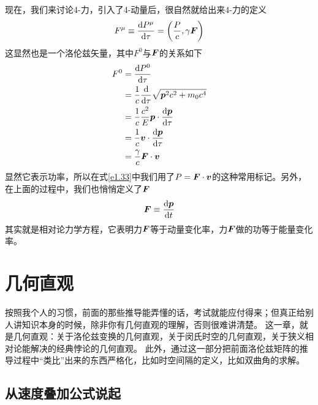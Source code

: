 \documentclass[12pt, a4paper, oneside]{ctexbook}
\begin{document}
现在，我们来讨论4-力，引入了4-动量后，很自然就给出来4-力的定义
\begin{equation}\label{e1.33}
	F^{\mu}\equiv\dv{P^{\mu}}{\tau}=\qty(\dfrac{P}{c},\gamma\vb*{F})
\end{equation}
这显然也是一个洛伦兹矢量，其中$F^{0}$与$\vb*{F}$的关系如下
\begin{equation}
	\begin{split}
		F^{0}&=\dv{P^{0}}{\tau}\\
		&=\dfrac{1}{c}\dv{\tau}\sqrt{\vb*{p}^{2}c^{2}+m_{0}c^{4}}\\
		&=\dfrac{1}{c}\dfrac{c^{2}}{E}\vb*{p}\cdot\dv{\vb*{p}}{\tau}\\
		&=\dfrac{1}{c}\vb*{v}\cdot\dv{\vb*{p}}{\tau}\\
		&=\dfrac{\gamma}{c}\vb*{F}\cdot\vb*{v}
	\end{split}
\end{equation}
显然它表示功率，所以在式\eqref{e1.33}中我们用了$P=\vb*{F}\cdot\vb*{v}$的这种常用标记。另外，在上面的过程中，我们也悄悄定义了$\vb*{F}$
\begin{equation}
	\vb*{F}\equiv\dv{\vb*{p}}{t}
\end{equation}
其实就是相对论力学方程，它表明力$\vb*{F}$等于动量变化率，力$\vb*{F}$做的功等于能量变化率。



\chapter{几何直观}

按照我个人的习惯，前面的那些推导能弄懂的话，考试就能应付得来；但真正给别人讲知识本身的时候，除非你有几何直观的理解，否则很难讲清楚。
这一章，就是几何直观：关于洛伦兹变换的几何直观，关于闵氏时空的几何直观，关于狭义相对论能解决的经典悖论的几何直观。
此外，通过这一部分把前面洛伦兹矩阵的推导过程中“类比”出来的东西严格化，比如时空间隔的定义，比如双曲角的求解。\par   

\section{从速度叠加公式说起}
\end{document}
